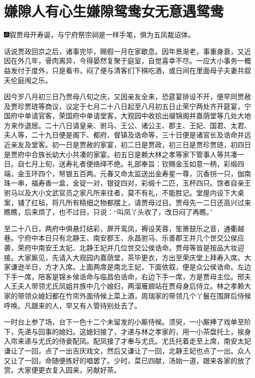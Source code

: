 
\chapter{嫌隙人有心生嫌隙\hspace{.5em}鸳鸯女无意遇鸳鸯}

{\includegraphics[width=3mm]{../Images/00005}\kaishu 叙贾母开寿诞，与宁府祭宗祠是一样手笔，俱为五凤裁诏体。}

话说贾政回京之后，诸事完毕，赐假一月在家歇息。因年景渐老，事重身衰，又近因在外几年，骨肉离异，今得晏然复聚于庭室，自觉喜幸不尽。一应大小事务一概益发付于度外，只是看书，闷了便与清客们下棋吃酒，或日间在里面母子夫妻共叙天伦庭闱之乐。

因今岁八月初三日乃贾母八旬之庆，又因亲友全来，恐筵宴排设不开，便早同贾赦及贾珍贾琏等商议，议定于七月二十八日起至八月初五日止荣宁两处齐开筵宴，宁国府中单请官客，荣国府中单请堂客，大观园中收拾出缀锦阁并嘉荫堂等几处大地方来作退居。二十八日请皇亲、驸马、王公、诸公主、郡主、王妃、国君、太君、夫人等，二十九日便是阁下、都府、督镇及诰命等，三十日便是诸官长及诰命并远近亲友及堂客。初一日是贾赦的家宴，初二日是贾政，初三日是贾珍贾琏，初四日是贾府中合族长幼大小共凑的家宴。初五日是赖大林之孝等家下管事人等共凑一日。自七月上旬，送寿礼者便络绎不绝。礼部奉旨：钦赐金玉如意一柄，彩缎四端，金玉环四个，帑银五百两。元春又命太监送出金寿星一尊，沉香拐一只，伽南珠一串，福寿香一盒，金锭一对，银锭四对，彩缎十二匹，玉杯四只。馀者自亲王驸马以及大小文武官员之家凡所来往者，莫不有礼，不能胜记。堂屋内设下大桌案，铺了红毡，将凡所有精细之物都摆上，请贾母过目。贾母先一二日还高兴过来瞧瞧，后来烦了，也不过目，只说：``叫凤丫头收了，改日闷了再瞧。''

至二十八日，两府中俱悬灯结彩，屏开鸾凤，褥设芙蓉，笙箫鼓乐之音，通衢越巷。宁府中本日只有北静王、南安郡王、永昌驸马、乐善郡王并几个世交公侯应袭，荣府中南安王太妃、北静王妃并几位世交公侯诰命。贾母等皆是按品大妆迎接。大家厮见，先请入大观园内嘉荫堂，茶毕更衣，方出至荣庆堂上拜寿入席。大家谦逊半日，方才入席。上面两席是南北王妃，下面依叙，便是众公侯诰命。左边下手一席，陪客是锦乡侯诰命与临昌伯诰命，右边下手一席，方是贾母主位。邢夫人王夫人带领尤氏凤姐并族中几个媳妇，两溜雁翅站在贾母身后侍立。林之孝赖大家的带领众媳妇都在竹帘外面侍候上菜上酒，周瑞家的带领几个丫鬟在围屏后侍候呼唤。凡跟来的人，早又有人管待别处去了。

一时台上参了场，台下一色十二个未留发的小厮侍候。须臾，一小厮捧了戏单至阶下，先递与回事的媳妇。这媳妇接了，才递与林之孝家的，用一小茶盘托上，挨身入帘来递与尤氏的侍妾配凤。配凤接了才奉与尤氏。尤氏托着走至上席，南安太妃谦让了一回，点了一出吉庆戏文，然后又谦让了一回，北静王妃也点了一出。众人又让了一回，命随便拣好的唱罢了。少时，菜已四献，汤始一道，跟来各家的放了赏。大家便更衣复入园来，另献好茶。

